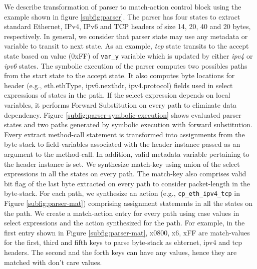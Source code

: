 \documentclass[letterpaper,twocolumn,10pt]{article}
\begin{document}
We describe transformation of parser to match-action control block using the example shown in figure \ref{subfig:parser}.
The parser has four states to extract standard Ethernet, IPv4, IPv6 and TCP headers of size 14, 20, 40 and 20 bytes, respectively.
In general, we consider that parser state may use any metadata or variable to transit to next state. 
As an example, \emph{tcp} state transits to the accept state based on value (0xFF) of \texttt{var\_y} variable which is updated by either \emph{ipv4} or \emph{ipv6} states.
The symbolic execution of the parser computes two possibles paths from the start state to the accept state.
It also computes byte locations for header (e.g., eth.ethType, ipv6.nexthdr, ipv4.protocol) fields used in select expressions of states in the path.
If the select expression depends on local variables, it performs Forward Substitution \cite{Padua:1986:ACO:7902.7904} on every path to eliminate data dependency.
Figure \ref{subfig:parser-symbolic-execution} shows evaluated parser states and two paths generated by symbolic execution with forward substitution.
Every extract method-call statement is transformed into assignments from the byte-stack to field-variables associated with the header instance passed as an argument to the method-call.
In addition, valid metadata variable pertaining to the header instance is set.
We synthesize match-key using union of the select expressions in all the states on every path.
The match-key also comprises valid bit flag of the last byte extracted on every path to consider packet-length in the byte-stack.
For each path, we synthesize an action (e.g., \texttt{cp\_eth\_ipv4\_tcp} in Figure \ref{subfig:parser-mat}) comprising assignment statements in all the states on the path.
We create a match-action entry for every path using case values in select expressions and the action synthesized for the path.
For example, in the first entry shown in Figure \ref{subfig:parser-mat}, x0800, x6, xFF are match-values for the first, third and fifth keys to parse byte-stack as ehternet, ipv4 and tcp headers.
The second and the forth keys can have any values, hence they are matched with don't care values.




\end{document}

